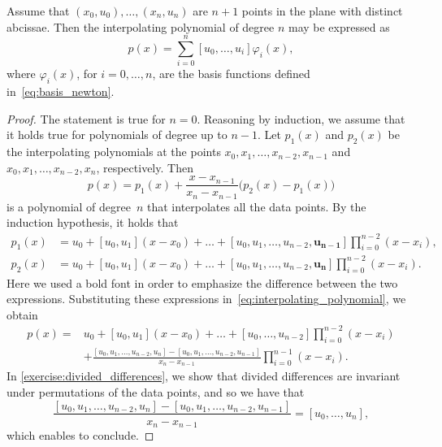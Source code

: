 \begin{proposition}
    Assume that $(x_0, u_0), \dotsc, (x_n, u_n)$ are $n+1$ points in the plane with distinct abcissae.
    Then the interpolating polynomial of degree $n$ may be expressed as
    \[
        p(x) = \sum_{i=0}^{n} [u_0, \dotsc, u_i] \varphi_i(x),
    \]
    where $\varphi_i(x)$, for $i = 0, \dotsc, n$, are the basis functions defined in~\eqref{eq:basis_newton}.
\end{proposition}
\begin{proof}
    The statement is true for $n = 0$.
    Reasoning by induction, we assume that it holds true for polynomials of degree up to $n-1$.
    Let $p_1(x)$ and $p_2(x)$ be the interpolating polynomials at the points
    $x_0, x_1, \dotsc, x_{n-2}, x_{n-1}$ and $x_0, x_1, \dotsc, x_{n-2}, x_{n}$, respectively.
    Then
    \begin{equation}
        \label{eq:interpolating_polynomial}
        p(x) = p_1(x) + \frac{x - x_{n-1}}{x_n - x_{n-1}} \bigl(p_2(x) - p_1(x)\bigr)
    \end{equation}
    is a polynomial of degree~$n$ that interpolates all the data points.
    By the induction hypothesis,
    it holds that
    \begin{align*}
        p_1(x) &= u_0 + [u_0, u_1] (x - x_0) + \dotsc + [u_0, u_1, \dotsc, u_{n-2}, \mathbf{u_{n-1}}] \prod_{i=0}^{n-2} (x - x_i), \\
        p_2(x) &= u_0 + [u_0, u_1] (x - x_0) + \dotsc + [u_0, u_1, \dotsc, u_{n-2}, \mathbf{u_{n}}] \prod_{i=0}^{n-2} (x - x_i).
    \end{align*}
    Here we used a bold font in order to emphasize the difference between the two expressions.
    Substituting these expressions in~\eqref{eq:interpolating_polynomial},
    we obtain
    \begin{align*}
        p(x) =
        &u_0 + [u_0, u_1] (x - x_0) + \dotsc + [u_0, \dotsc, u_{n-2}] \prod_{i=0}^{n-2} (x - x_i)  \\
        & + \frac{[u_0, u_1, \dotsc, u_{n-2}, u_{n}] - [u_0, u_1, \dotsc, u_{n-2}, u_{n-1}]}{x_n - x_{n-1}} \prod_{i=0}^{n-1} (x - x_i).
    \end{align*}
    In \cref{exercise:divided_differences},
    we show that divided differences are invariant under permutations of the data points,
    and so we have that
    \[
        \frac{[u_0, u_1, \dotsc, u_{n-2}, u_{n}] - [u_0, u_1, \dotsc, u_{n-2}, u_{n-1}]}{x_n - x_{n-1}} = [u_0, \dotsc, u_n],
    \]
    which enables to conclude.
\end{proof}
